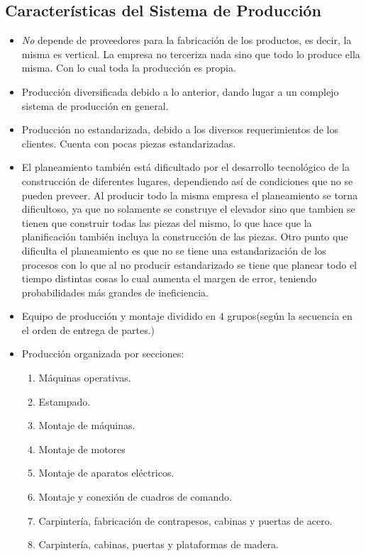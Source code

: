 \documentclass[12pt,a4paper,spanish]{article}
\begin{document}
\subsection{Caracter\'{i}sticas del Sistema de Producci\'{o}n}
\begin{itemize}
	\item \emph{No} depende de proveedores para la fabricaci\'{o}n de los productos, es decir, la misma es vertical. La empresa no terceriza nada sino que todo lo produce ella misma. Con lo cual toda la producci\'{o}n es propia.
	\item Producci\'{o}n diversificada debido a lo anterior, dando lugar a un complejo sistema de producci\'on en general.
	\item Producci\'{o}n no estandarizada, debido a los diversos requerimientos de los clientes. Cuenta con pocas piezas estandarizadas.
	\item El planeamiento tambi\'{e}n est\'a dificultado por el desarrollo tecnol\'ogico de la construcci\'on de diferentes lugares, dependiendo as\'i de condiciones que no se pueden preveer. Al producir todo la misma empresa el planeamiento se torna dificultoso, ya que no solamente se construye el elevador sino que tambien se tienen que construir todas las piezas del mismo, lo que hace que la planificaci\'{o}n tambi\'{e}n incluya la construcci\'{o}n de las piezas. Otro punto que dificulta el planeamiento es que no se tiene una estandarizaci\'{o}n de los procesos con lo que al no producir estandarizado se tiene que planear todo el tiempo distintas cosas lo cual aumenta el margen de error, teniendo probabilidades m\'{a}s grandes de ineficiencia.
	\item Equipo de producci\'{o}n y montaje dividido en 4 grupos(seg\'{u}n la secuencia en el orden de entrega de partes.)
	\item Producci\'{o}n organizada por secciones:
	\begin{enumerate}
		\item M\'{a}quinas operativas.
		\item Estampado.
		\item Montaje de m\'{a}quinas.
		\item Montaje de motores
		\item Montaje de aparatos el\'{e}ctricos.
		\item Montaje y conexi\'{o}n de cuadros de comando.
		\item Carpinter\'{i}a, fabricaci\'{o}n de contrapesos, cabinas y 	puertas de acero.
		\item Carpinter\'ia, cabinas, puertas y plataformas de madera.

\end{enumerate}
\end{itemize}
\end{document}
